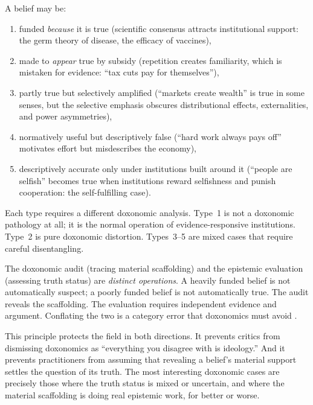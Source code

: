 A belief may be:
\begin{enumerate}[nosep]
  \item funded \emph{because} it is true (scientific consensus attracts institutional support: the germ theory of disease, the efficacy of vaccines),
  \item made to \emph{appear} true by subsidy (repetition creates familiarity, which is mistaken for evidence: ``tax cuts pay for themselves''),
  \item partly true but selectively amplified (``markets create wealth'' is true in some senses, but the selective emphasis obscures distributional effects, externalities, and power asymmetries),
  \item normatively useful but descriptively false (``hard work always pays off'' motivates effort but misdescribes the economy),
  \item descriptively accurate only under institutions built around it (``people are selfish'' becomes true when institutions reward selfishness and punish cooperation: the self-fulfilling case).
\end{enumerate}

Each type requires a different doxonomic analysis.
Type~1 is not a doxonomic pathology at all; it is the normal operation of evidence-responsive institutions.
Type~2 is pure doxonomic distortion.
Types~3--5 are mixed cases that require careful disentangling.

\begin{principle}
\label{prin:separation}
The doxonomic audit (tracing material scaffolding) and the epistemic evaluation (assessing truth status) are \emph{distinct operations}.
A heavily funded belief is not automatically suspect; a poorly funded belief is not automatically true.
The audit reveals the scaffolding.
The evaluation requires independent evidence and argument.
Conflating the two is a category error that doxonomics must avoid \autocite{mannheim1936, fricker2007}.
\end{principle}

\begin{remark}
This principle protects the field in both directions.
It prevents critics from dismissing doxonomics as ``everything you disagree with is ideology.''
And it prevents practitioners from assuming that revealing a belief's material support settles the question of its truth.
The most interesting doxonomic cases are precisely those where the truth status is mixed or uncertain, and where the material scaffolding is doing real epistemic work, for better or worse.
\end{remark}


